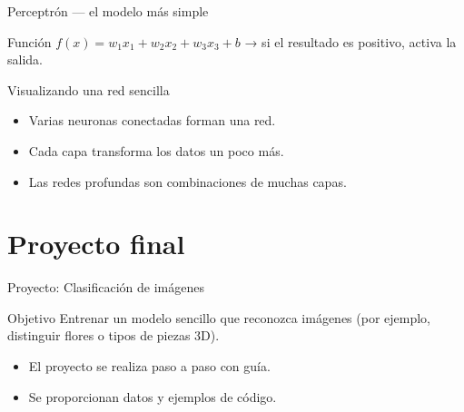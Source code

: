 \documentclass[10pt,aspectratio=169]{beamer}
\begin{document}
\begin{frame}{Perceptrón — el modelo más simple}
  \centering
  \vspace{0.5em}
  \begin{block}{Función}
    $f(x) = w_1x_1 + w_2x_2 + w_3x_3 + b$  →  si el resultado es positivo, activa la salida.
  \end{block}
\end{frame}

\begin{frame}{Visualizando una red sencilla}
  \begin{itemize}
    \item Varias neuronas conectadas forman una red.
    \item Cada capa transforma los datos un poco más.
    \item Las redes profundas son combinaciones de muchas capas.
  \end{itemize}
\end{frame}

\section{Proyecto final}

\begin{frame}{Proyecto: Clasificación de imágenes}
  \begin{block}{Objetivo}
    Entrenar un modelo sencillo que reconozca imágenes (por ejemplo, distinguir flores o tipos de piezas 3D).
  \end{block}
  \begin{itemize}
    \item El proyecto se realiza paso a paso con guía.
    \item Se proporcionan datos y ejemplos de código.
  \end{itemize}
\end{frame}
\end{document}
